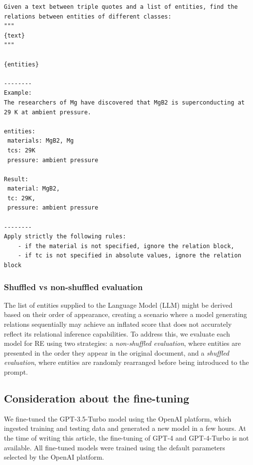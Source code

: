 \begin{lstlisting}[caption=Few-shot prompting for extracting relations from lists of entities]
Given a text between triple quotes and a list of entities, find the relations between entities of different classes: 
"""
{text}
"""

{entities}

--------
Example: 
The researchers of Mg have discovered that MgB2 is superconducting at 29 K at ambient pressure.

entities:
 materials: MgB2, Mg
 tcs: 29K
 pressure: ambient pressure
 
Result: 
 material: MgB2, 
 tc: 29K, 
 pressure: ambient pressure
 
--------
Apply strictly the following rules:  
    - if the material is not specified, ignore the relation block,
    - if tc is not specified in absolute values, ignore the relation block 
\end{lstlisting}


\subsubsection{Shuffled vs non-shuffled evaluation}
\label{subsub:shuffled-non_shuffled-eval}
The list of entities supplied to the Language Model (LLM) might be derived based on their order of appearance, creating a scenario where a model generating relations sequentially may achieve an inflated score that does not accurately reflect its relational inference capabilities. 
To address this, we evaluate each model for RE using two strategies: a \emph{non-shuffled evaluation}, where entities are presented in the order they appear in the original document, and a \emph{shuffled evaluation}, where entities are randomly rearranged before being introduced to the prompt.

\subsection{Consideration about the fine-tuning}
\label{subsec:consideration-fine-tuning}

We fine-tuned the GPT-3.5-Turbo model using the OpenAI platform, which ingested training and testing data and generated a new model in a few hours. 
At the time of writing this article, the fine-tuning of GPT-4 and GPT-4-Turbo is not available. 
All fine-tuned models were trained using the default parameters selected by the OpenAI platform.

